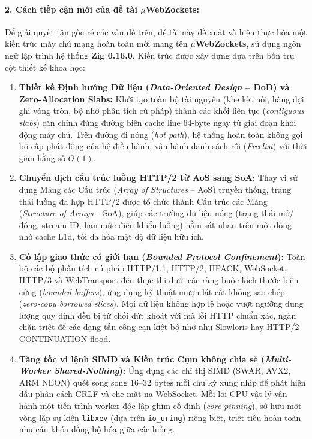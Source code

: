 \documentclass[letterpaper]{article}
\begin{document}
\paragraph{2. Cách tiếp cận mới của đề tài $\mu$WebZockets:}
Để giải quyết tận gốc rễ các vấn đề trên, đề tài này đề xuất và hiện thực hóa một kiến trúc máy chủ mạng hoàn toàn mới mang tên \textbf{$\mu$WebZockets}, sử dụng ngôn ngữ lập trình hệ thống \textbf{Zig 0.16.0}. Kiến trúc được xây dựng dựa trên bốn trụ cột thiết kế khoa học:
\begin{enumerate}
    \item \textbf{Thiết kế Định hướng Dữ liệu (\emph{Data-Oriented Design} -- DoD) và Zero-Allocation Slabs:} Khởi tạo toàn bộ tài nguyên (khe kết nối, hàng đợi ghi vòng tròn, bộ nhớ phân tích cú pháp) thành các khối liên tục (\emph{contiguous slabs}) căn chỉnh đúng đường biên cache line 64-byte ngay từ giai đoạn khởi động máy chủ. Trên đường đi nóng (\emph{hot path}), hệ thống hoàn toàn không gọi bộ cấp phát động của hệ điều hành, vận hành danh sách rỗi (\emph{Freelist}) với thời gian hằng số $O(1)$.
    \item \textbf{Chuyển dịch cấu trúc luồng HTTP/2 từ AoS sang SoA:} Thay vì sử dụng Mảng các Cấu trúc (\emph{Array of Structures} -- AoS) truyền thống, trạng thái luồng đa hợp HTTP/2 được tổ chức thành Cấu trúc các Mảng (\emph{Structure of Arrays} -- SoA), giúp các trường dữ liệu nóng (trạng thái mở/đóng, stream ID, hạn mức điều khiển luồng) nằm sát nhau trên một dòng nhớ cache L1d, tối đa hóa mật độ dữ liệu hữu ích.
    \item \textbf{Cô lập giao thức có giới hạn (\emph{Bounded Protocol Confinement}):} Toàn bộ các bộ phân tích cú pháp HTTP/1.1, HTTP/2, HPACK, WebSocket, HTTP/3 và WebTransport đều thực thi dưới các ràng buộc kích thước biên cứng (\emph{bounded buffers}), ứng dụng kỹ thuật mượn lát cắt không sao chép (\emph{zero-copy borrowed slices}). Mọi dữ liệu không hợp lệ hoặc vượt ngưỡng dung lượng quy định đều bị từ chối dứt khoát với mã lỗi HTTP chuẩn xác, ngăn chặn triệt để các dạng tấn công cạn kiệt bộ nhớ như Slowloris hay HTTP/2 CONTINUATION flood.
    \item \textbf{Tăng tốc vi lệnh SIMD và Kiến trúc Cụm không chia sẻ (\emph{Multi-Worker Shared-Nothing}):} Ứng dụng các chỉ thị SIMD (SWAR, AVX2, ARM NEON) quét song song $16\text{--}32\text{ bytes}$ mỗi chu kỳ xung nhịp để phát hiện dấu phân cách CRLF và che mặt nạ WebSocket. Mỗi lõi CPU vật lý vận hành một tiến trình worker độc lập ghim cố định (\emph{core pinning}), sở hữu một vòng lặp sự kiện \texttt{libxev} (dựa trên \texttt{io\_uring}) riêng biệt, triệt tiêu hoàn toàn nhu cầu khóa đồng bộ hóa giữa các luồng.
\end{enumerate}
\end{document}
